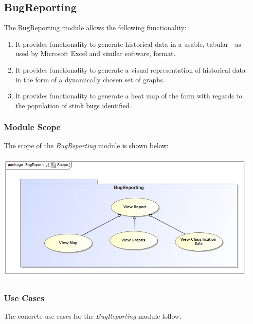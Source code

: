 \documentclass[11pt,a4paper,titlepage]{article}
\begin{document}
		
		
	\subsection{BugReporting}
	The BugReporting module allows the following functionality:
	\begin{enumerate}
		\item It provides functionality to generate historical data in a usable, tabular - as used by Microsoft Excel and similar software, format.
		\item It provides functionality to generate a visual representation of historical data in the form of a dynamically chosen set of graphs.
		\item It provides functionality to generate a heat map of the farm with regards to the population of stink bugs identified.
	\end{enumerate}
		\subsubsection{Module Scope}
		The scope of the \textit{BugReporting} module is shown below:\\
		\hfill\\
			\includegraphics[width=\linewidth]{ReportingScope}
		\subsubsection{Use Cases}
		The concrete use cases for the \textit{BugReporting} module follow:
\end{document}
